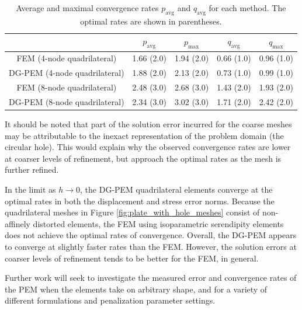 \begin{table}[!ht]
  \begin{center}
    \begin{tabular}{| c || c | c || c | c |}
    \hline
           & $p_{\text{avg}}$ & $p_{\text{max}}$ & $q_{\text{avg}}$ & $q_{\text{max}}$ \\ \hline \hline
    FEM (4-node quadrilateral)    & 1.66 (2.0) & 1.94 (2.0) & 0.66 (1.0) & 0.96 (1.0) \\ \hline
    DG-PEM (4-node quadrilateral) & 1.88 (2.0) & 2.13 (2.0) & 0.73 (1.0) & 0.99 (1.0) \\ \hline
    FEM (8-node quadrilateral)    & 2.48 (3.0) & 2.68 (3.0) & 1.43 (2.0) & 1.93 (2.0) \\ \hline
    DG-PEM (8-node quadrilateral) & 2.34 (3.0) & 3.02 (3.0) & 1.71 (2.0) & 2.42 (2.0) \\
    \hline
    \end{tabular}
    \caption{Average and maximal convergence rates $p_{\text{avg}}$ and $q_{\text{avg}}$ for each method. The optimal rates are shown in parentheses.}
    \vspace{-5pt}
    \label{tab:plate_with_hole_convergence_rates}
    \vspace{-25pt}
  \end{center}
\end{table}

It should be noted that part of the solution error incurred for the coarse meshes may be attributable to the inexact representation of the problem domain (the circular hole). This would explain why the observed convergence rates are lower at coarser levels of refinement, but approach the optimal rates as the mesh is further refined.

In the limit as $h \rightarrow 0$, the DG-PEM quadrilateral elements converge at the optimal rates in both the displacement and stress error norms. Because the quadrilateral meshes in Figure \ref{fig:plate_with_hole_meshes} consist of non-affinely distorted elements, the FEM using isoparametric serendipity elements does not achieve the optimal rates of convergence. Overall, the DG-PEM appears to converge at slightly faster rates than the FEM. However, the solution errors at coarser levels of refinement tends to be better for the FEM, in general.

Further work will seek to investigate the measured error and convergence rates of the PEM when the elements take on arbitrary shape, and for a variety of different formulations and penalization parameter settings.

